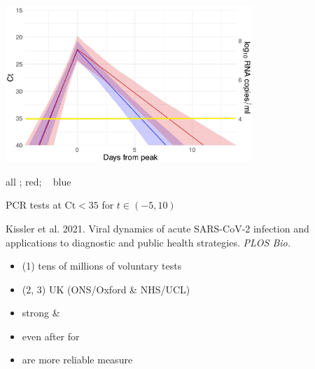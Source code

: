 \documentclass[9pt]{report}
\begin{document}
\includegraphics[width=0.7\textwidth]{img/bball-days-from-peak.png}
\begin{subitemize}
\vspace*{-4pt}
\item all ; 
 red; \  blue
\vspace*{-4pt}
\item PCR tests  at $\textrm{Ct} < 35$ for $t \in (-5, 10)$
\vspace*{-4pt}
\item \footnotesize Kissler et al. 2021. Viral dynamics of acute
  SARS-CoV-2 infection and applications to diagnostic and public
  health strategies. \textit{PLOS Bio.}
\end{subitemize}



\begin{itemize}
\item (1) tens of millions of voluntary tests
\item (2, 3) UK  (ONS/Oxford \& NHS/UCL)
\item strong  \& 
\item even after  for 
  \vfill
\item {} are more reliable measure
\end{itemize}
\end{document}
